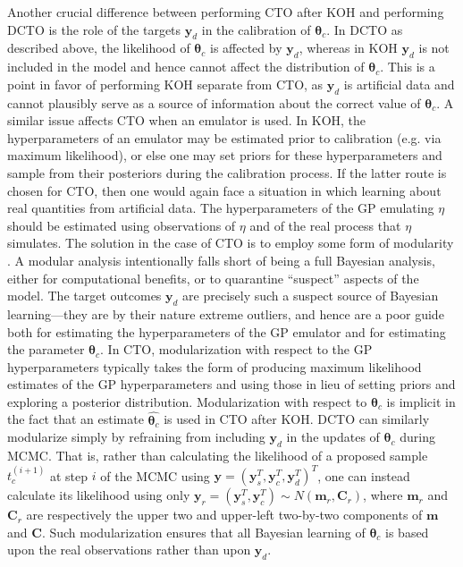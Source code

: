 \documentclass[12pt]{article}
\begin{document}
%
Another crucial difference between performing CTO after KOH and performing DCTO is the role of the targets $\mathbf y_d$ in the calibration of $\boldsymbol\theta_c$.
%
In DCTO as described above, the likelihood of $\boldsymbol\theta_c$ is affected by $\mathbf y_d$, whereas in KOH $\mathbf y_d$ is not included in the model and hence cannot affect the distribution of $\boldsymbol\theta_c$.
%
This is a point in favor of performing KOH separate from CTO, as $\mathbf y_d$ is artificial data and cannot plausibly serve as a source of information about the correct value of $\boldsymbol\theta_c$.
%
A similar issue affects CTO when an emulator is used.
%
In KOH, the hyperparameters of an emulator may be estimated prior to calibration (e.g. via maximum likelihood), or else one may set priors for these hyperparameters and sample from their posteriors during the calibration process.
%
If the latter route is chosen for CTO, then one would again face a situation in which learning about real quantities from artificial data.
%
The hyperparameters of the GP emulating $\eta$ should be estimated using observations of $\eta$ and of the real process that $\eta$ simulates.
%
The solution in the case of CTO is to employ some form of modularity \citep{Liu2009}.
%
A modular analysis intentionally falls short of being a full Bayesian analysis, either for computational benefits, or to quarantine ``suspect'' aspects of the model.
%
The target outcomes $\mathbf y_d$ are precisely such a suspect source of Bayesian learning---they are by their nature extreme outliers, and hence are a poor guide both for estimating the hyperparameters of the GP emulator and for estimating the parameter $\boldsymbol\theta_c$.
%
In CTO, modularization with respect to the GP hyperparameters typically takes the form of producing maximum likelihood estimates of the GP hyperparameters and using those in lieu of setting priors and exploring a posterior distribution.
%
Modularization with respect to $\boldsymbol\theta_c$ is implicit in the fact that an estimate $\widehat{\boldsymbol\theta_c}$ is used in CTO after KOH.
%
DCTO can similarly modularize simply by refraining from including $\mathbf y_d$ in the updates of $\boldsymbol\theta_c$ during MCMC.
%
That is, rather than calculating the likelihood of a proposed sample $t_c^{(i+1)}$ at step $i$ of the MCMC using $\mathbf y = (\mathbf y_s^T, \mathbf y_c^T, \mathbf y_d^T)^T$, one can instead calculate its likelihood using only $\mathbf y_r = (\mathbf y_s^T, \mathbf y_c^T)\sim N(\mathbf m_r,\mathbf C_r)$, where $\mathbf m_r$ and $\mathbf C_r$ are respectively the upper two and upper-left two-by-two components of $\mathbf m$ and $\mathbf C$.
%
Such modularization ensures that all Bayesian learning of $\boldsymbol\theta_c$ is based upon the real observations rather than upon $\mathbf y_d$.
%
\end{document}
